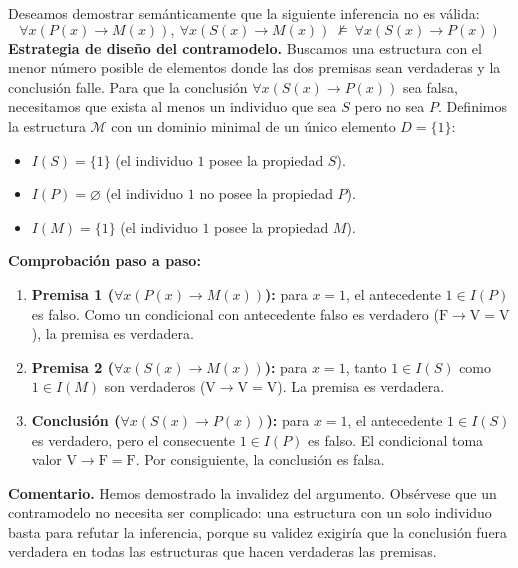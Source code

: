 \begin{ejemplo}
Deseamos demostrar semánticamente que la siguiente inferencia no es válida:
\[
\forall x (P(x) \to M(x)), \ \forall x (S(x) \to M(x)) \ \not\models \ \forall x (S(x) \to P(x))
\]
\textbf{Estrategia de diseño del contramodelo.}
Buscamos una estructura con el menor número posible de elementos donde las dos premisas sean verdaderas y la conclusión falle. Para que la conclusión $\forall x (S(x) \to P(x))$ sea falsa, necesitamos que exista al menos un individuo que sea $S$ pero no sea $P$.
Definimos la estructura $\mathcal{M}$ con un dominio minimal de un único elemento $D = \{1\}$:
\begin{itemize}
    \item $I(S) = \{1\}$ (el individuo $1$ posee la propiedad $S$).
    \item $I(P) = \varnothing$ (el individuo $1$ no posee la propiedad $P$).
    \item $I(M) = \{1\}$ (el individuo $1$ posee la propiedad $M$).
\end{itemize}
\textbf{Comprobación paso a paso:}
\begin{enumerate}
    \item \textbf{Premisa 1 ($\forall x (P(x) \to M(x))$):} para $x=1$, el antecedente $1 \in I(P)$ es falso. Como un condicional con antecedente falso es verdadero ($\text{F} \to \text{V} = \text{V}$), la premisa es verdadera.
    \item \textbf{Premisa 2 ($\forall x (S(x) \to M(x))$):} para $x=1$, tanto $1 \in I(S)$ como $1 \in I(M)$ son verdaderos ($\text{V} \to \text{V} = \text{V}$). La premisa es verdadera.
    \item \textbf{Conclusión ($\forall x (S(x) \to P(x))$):} para $x=1$, el antecedente $1 \in I(S)$ es verdadero, pero el consecuente $1 \in I(P)$ es falso. El condicional toma valor $\text{V} \to \text{F} = \text{F}$. Por consiguiente, la conclusión es falsa.
\end{enumerate}
\textbf{Comentario.} Hemos demostrado la invalidez del argumento. Obsérvese que un contramodelo no necesita ser complicado: una estructura con un solo individuo basta para refutar la inferencia, porque su validez exigiría que la conclusión fuera verdadera en todas las estructuras que hacen verdaderas las premisas.
\end{ejemplo}


